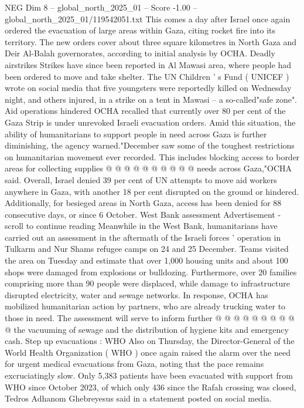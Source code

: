 \begin{textsample}{NEG Dim 8 – global\_north\_2025\_01 – Score -1.00 – global\_north\_2025\_01/119542051.txt}  \label{ex:f8_neg_170}
This comes a day after Israel once again ordered the evacuation of large areas within Gaza, citing rocket fire into its territory.
The new orders cover about three square kilometres in North Gaza and Deir Al-Balah governorates, according to initial analysis by OCHA.
Deadly airstrikes Strikes have since been reported in Al Mawasi area, where people had been ordered to move and take shelter.
The UN Children ' s Fund ( UNICEF ) wrote on social media that five youngsters were reportedly killed on Wednesday night, and others injured, in a strike on a tent in Mawasi -- a so-called"safe zone".
Aid operations hindered OCHA recalled that currently over 80 per cent of the Gaza Strip is under unrevoked Israeli evacuation orders.
Amid this situation, the ability of humanitarians to support people in need across Gaza is further diminishing, the agency warned."December saw some of the toughest restrictions on humanitarian movement ever recorded.
This includes blocking access to border areas for collecting supplies @ @ @ @ @ @ @ @ @ @ needs across Gaza,"OCHA said.
Overall, Israel denied 39 per cent of UN attempts to move aid workers anywhere in Gaza, with another 18 per cent disrupted on the ground or hindered.
Additionally, for besieged areas in North Gaza, access has been denied for 88 consecutive days, or since 6 October.
West Bank assessment Advertisement - scroll to continue reading Meanwhile in the West Bank, humanitarians have carried out an assessment in the aftermath of the Israeli forces ' operation in Tulkarm and Nur Shams refugee camps on 24 and 25 December.
Teams visited the area on Tuesday and estimate that over 1,000 housing units and about 100 shops were damaged from explosions or bulldozing.
Furthermore, over 20 families comprising more than 90 people were displaced, while damage to infrastructure disrupted electricity, water and sewage networks.
In response, OCHA has mobilized humanitarian action by partners, who are already trucking water to those in need.
The assessment will serve to inform further @ @ @ @ @ @ @ @ @ @ the vacuuming of sewage and the distribution of hygiene kits and emergency cash.
Step up evacuations : WHO Also on Thursday, the Director-General of the World Health Organization ( WHO ) once again raised the alarm over the need for urgent medical evacuations from Gaza, noting that the pace remains excruciatingly slow.
Only 5,383 patients have been evacuated with support from WHO since October 2023, of which only 436 since the Rafah crossing was closed, Tedros Adhanom Ghebreyesus said in a statement posted on social media.

\end{textsample}
